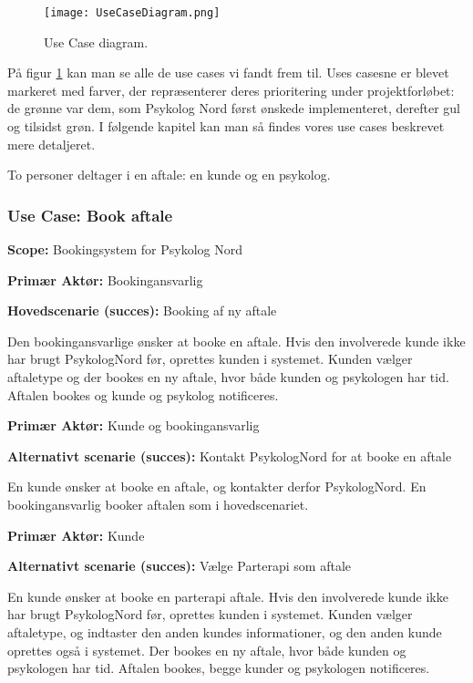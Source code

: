 \begin{figure}[p]
	\centering
  		\texttt{[image: UseCaseDiagram.png]}
  \caption{Use Case diagram.}
  \label{fig:UseCaseDiagram}
\end{figure}

På figur \ref{fig:UseCaseDiagram} kan man se alle de use cases vi fandt frem til.
Uses casesne er blevet markeret med farver, der repræsenterer deres prioritering under projektforløbet: de grønne var dem, som Psykolog Nord først ønskede implementeret, derefter gul og tilsidst grøn.
I følgende kapitel kan man så findes vores use cases beskrevet mere detaljeret. 

To personer deltager i en aftale: en kunde og en psykolog.

\subsubsection{Use Case: Book aftale}\label{usecase:bookaftale}
{\setlength{\parindent}{0cm}
\textbf{Scope:} Bookingsystem for Psykolog Nord

\textbf{Primær Aktør:} Bookingansvarlig

\textbf{Hovedscenarie (succes):} Booking af ny aftale

Den bookingansvarlige ønsker at booke en aftale.
Hvis den involverede kunde ikke har brugt PsykologNord før, oprettes kunden i systemet.
Kunden vælger aftaletype og der bookes en ny aftale, hvor både kunden og psykologen har tid. 
Aftalen bookes og kunde og psykolog notificeres.

\textbf{Primær Aktør:} Kunde og bookingansvarlig

\textbf{Alternativt scenarie (succes):} Kontakt PsykologNord for at booke en aftale

En kunde ønsker at booke en aftale, og kontakter derfor PsykologNord.
En bookingansvarlig booker aftalen som i hovedscenariet.

\textbf{Primær Aktør:} Kunde

\textbf{Alternativt scenarie (succes):} Vælge Parterapi som aftale

En kunde ønsker at booke en parterapi aftale.
Hvis den involverede kunde ikke har brugt PsykologNord før, oprettes kunden i systemet.
Kunden vælger aftaletype, og indtaster den anden kundes informationer, og den anden kunde oprettes også i systemet.
Der bookes en ny aftale, hvor både kunden og psykologen har tid. 
Aftalen bookes, begge kunder og psykologen notificeres.
}

